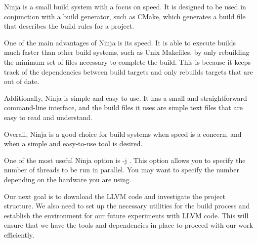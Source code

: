 
Ninja is a small build system with a focus on speed. It is designed to be used in conjunction with a build generator, such as CMake, which generates a build file that describes the build rules for a project.

One of the main advantages of Ninja is its speed. It is able to execute builds much faster than other build systems, such as Unix Makefiles, by only rebuilding the minimum set of files necessary to complete the build. This is because it keeps track of the dependencies between build targets and only rebuilds targets that are out of date.

Additionally, Ninja is simple and easy to use. It has a small and straightforward command-line interface, and the build files it uses are simple text files that are easy to read and understand.

Overall, Ninja is a good choice for build systems when speed is a concern, and when a simple and easy-to-use tool is desired.

One of the most useful Ninja option is -j . This option allows you to specify the number of threads to be run in parallel. You may want to specify the number depending on the hardware you are using.

Our next goal is to download the LLVM code and investigate the project structure. We also need to set up the necessary utilities for the build process and establish the environment for our future experiments with LLVM code. This will ensure that we have the tools and dependencies in place to proceed with our work efficiently.






























